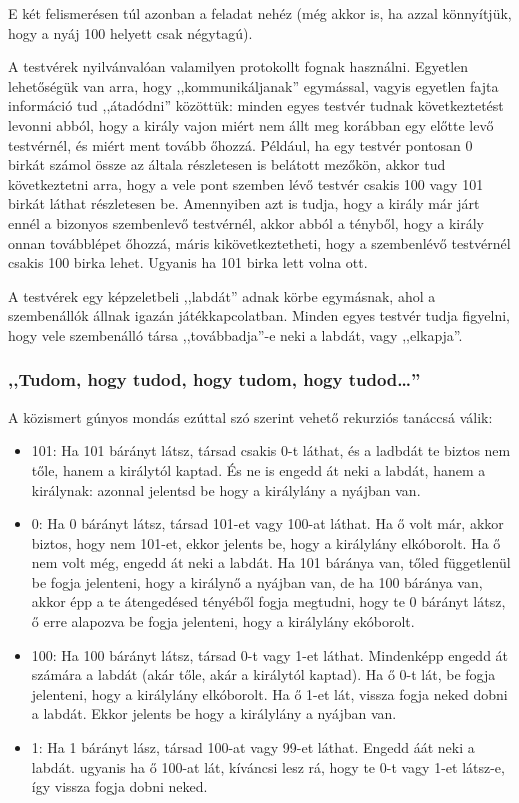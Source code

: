 \documentclass{article}
\begin{document}
	E két felismerésen túl azonban a feladat nehéz (még akkor is, ha azzal könnyítjük, hogy a nyáj 100 helyett csak négytagú).
 
	A testvérek nyilvánvalóan valamilyen protokollt fognak használni. Egyetlen lehetőségük van arra, hogy ,,kommunikáljanak'' egymással, vagyis egyetlen fajta információ tud ,,átadódni'' közöttük: minden egyes testvér tudnak következtetést levonni abból, hogy a király vajon miért nem állt meg korábban egy előtte levő testvérnél, és miért ment tovább őhozzá. Például, ha egy testvér pontosan 0 birkát számol össze az általa részletesen is belátott mezőkön, akkor tud következtetni arra, hogy a vele pont szemben lévő testvér csakis 100 vagy 101 birkát láthat részletesen be. Amennyiben azt is tudja, hogy a király már járt ennél a bizonyos szembenlevő testvérnél, akkor abból a tényből, hogy a király onnan továbblépet őhozzá, máris kikövetkeztetheti, hogy a szembenlévő testvérnél csakis 100 birka lehet. Ugyanis ha 101 birka lett volna ott.

	A testvérek egy képzeletbeli ,,labdát'' adnak körbe egymásnak, ahol a szembenállók állnak igazán játékkapcolatban. Minden egyes testvér tudja figyelni, hogy vele szembenálló társa ,,továbbadja''-e neki a labdát, vagy ,,elkapja''.

	\subsubsection{,,Tudom, hogy tudod, hogy tudom, hogy tudod\dots''}

	A közismert gúnyos mondás ezúttal szó szerint vehető rekurziós tanáccsá válik:

	\begin{itemize}
		\item 101: Ha 101 bárányt látsz, társad csakis 0-t láthat, és a ladbdát te biztos nem tőle, hanem a királytól kaptad. És ne is engedd át neki a labdát, hanem a királynak: azonnal jelentsd be hogy a királylány a nyájban van.
		\item 0: Ha   0 bárányt látsz, társad 101-et vagy 100-at láthat. Ha ő volt már, akkor biztos, hogy nem 101-et, ekkor jelents be, hogy a királylány elkóborolt. Ha ő nem volt még, engedd át neki a labdát. Ha 101 báránya van, tőled függetlenül be fogja jelenteni, hogy a királynő a nyájban van, de ha 100 báránya van, akkor  épp a te átengedésed tényéből fogja megtudni, hogy te 0 bárányt látsz, ő erre alapozva be fogja jelenteni, hogy a királylány ekóborolt.
		\item 100: Ha 100 bárányt látsz, társad 0-t vagy 1-et láthat. Mindenképp engedd át számára a labdát (akár tőle, akár a királytól kaptad). Ha ő 0-t lát, be fogja jelenteni, hogy a királylány elkóborolt. Ha ő 1-et lát, vissza fogja neked dobni a labdát. Ekkor jelents be hogy a királylány a nyájban van.
		\item 1: Ha 1 bárányt lász, társad 100-at vagy 99-et láthat. Engedd áát neki a labdát. ugyanis ha ő 100-at lát, kíváncsi lesz rá, hogy te 0-t vagy 1-et látsz-e, így vissza fogja dobni neked.
	\end{itemize}
\end{document}
